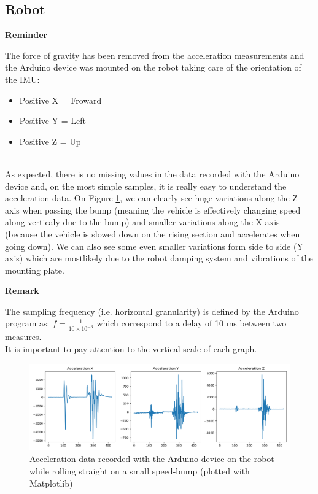 \subsection{Robot}

\noindent
\begin{minipage}[!hc]{0.12\textwidth}
   \textbf{Reminder}
\end{minipage}
\vrule\enskip\vrule\quad\begin{minipage}{\dimexpr 0.87\textwidth-0.8pt-1.5em}
The force of gravity has been removed from the acceleration measurements and the Arduino device was mounted on the robot taking care of the orientation of the IMU:
\begin{itemize}
    \item Positive X = Froward
    \item Positive Y = Left
    \item Positive Z = Up
\end{itemize}
\end{minipage}
\\
As expected, there is no missing values in the data recorded with the Arduino device and, on the most simple samples, it is really easy to understand the acceleration data. On Figure \ref{bump_1}, we can clearly see huge variations along the Z axis when passing the bump (meaning the vehicle is effectively changing speed along verticaly due to the bump) and smaller variations along the X axis (because the vehicle is slowed down on the rising section and accelerates when going down). We can also see some even smaller variations form side to side (Y axis) which are mostlikely due to the robot damping system and vibrations of the mounting plate.\\

\noindent
\begin{minipage}[!hc]{0.12\textwidth}
   \textbf{Remark}
\end{minipage}
\vrule\enskip\vrule\quad\begin{minipage}{\dimexpr 0.87\textwidth-0.8pt-1.5em}
The sampling frequency (i.e. horizontal granularity) is defined by the Arduino program as: \(f = \frac{1}{10 \times 10^{-3}}\) which correspond to a delay of 10 ms between two measures.\\
It is important to pay attention to the vertical scale of each graph.
\end{minipage}

\begin{figure}
    \center
    \includegraphics[scale=0.5]{img/DATA1.png}
    \caption{Acceleration data recorded with the Arduino device on the robot while rolling straight on a small speed-bump (plotted with Matplotlib)}
    \label{bump_1}
\end{figure}

